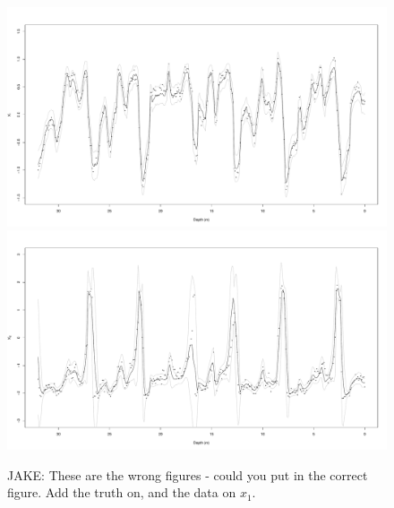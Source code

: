 \documentclass[a4paper,12pt]{article}
\begin{document}
\begin{figure}
\centering
\includegraphics[scale=0.15]{CompactionSS01X01.pdf}\\
\includegraphics[scale=0.15]{CompactionSS01X02.pdf}
\caption{JAKE: These are the wrong figures - could you put in the correct figure. Add the truth on, and the data on $x_1$.   }
\label{Fig:Trajectories}
\end{figure}


%
%
%
\end{document}
